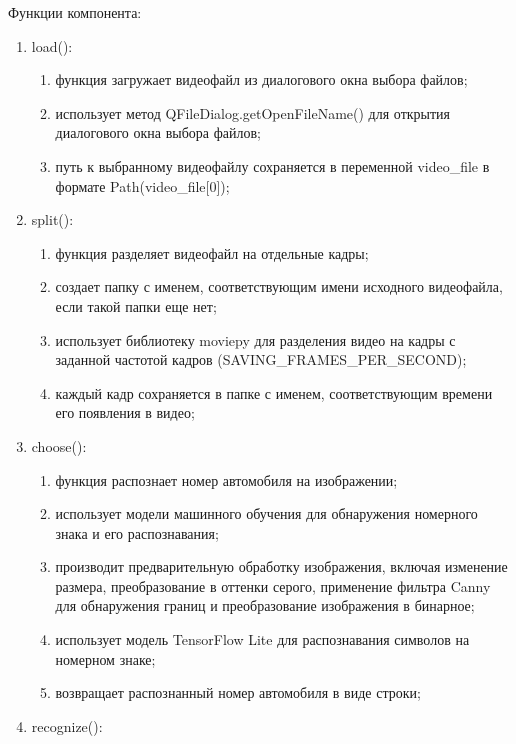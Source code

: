     Функции компонента:
    \begin{enumerate}
        \item load():
            \begin{enumerate}
                \item функция загружает видеофайл из диалогового окна выбора файлов;
                \item использует метод QFileDialog.getOpenFileName() для открытия диалогового окна выбора файлов;
                \item путь к выбранному видеофайлу сохраняется в переменной video\_file в формате Path(video\_file[0]);
            \end{enumerate}
        \item split():
            \begin{enumerate}
                \item функция разделяет видеофайл на отдельные кадры;
                \item создает папку с именем, соответствующим имени исходного видеофайла, если такой папки еще нет;
                \item использует библиотеку moviepy для разделения видео на кадры с заданной частотой кадров (SAVING\_FRAMES\_PER\_SECOND);
                \item каждый кадр сохраняется в папке с именем, соответствующим времени его появления в видео;
            \end{enumerate}
        \item choose():
            \begin{enumerate}
                \item функция распознает номер автомобиля на изображении;
                \item использует модели машинного обучения для обнаружения номерного знака и его распознавания;
                \item производит предварительную обработку изображения, включая изменение размера, преобразование в оттенки серого, применение фильтра Canny для обнаружения границ и преобразование изображения в бинарное;
                \item использует модель TensorFlow Lite для распознавания символов на номерном знаке;
                \item возвращает распознанный номер автомобиля в виде строки;
            \end{enumerate}
        \item recognize():
            \begin{enumerate}

\end{enumerate}
\end{enumerate}
